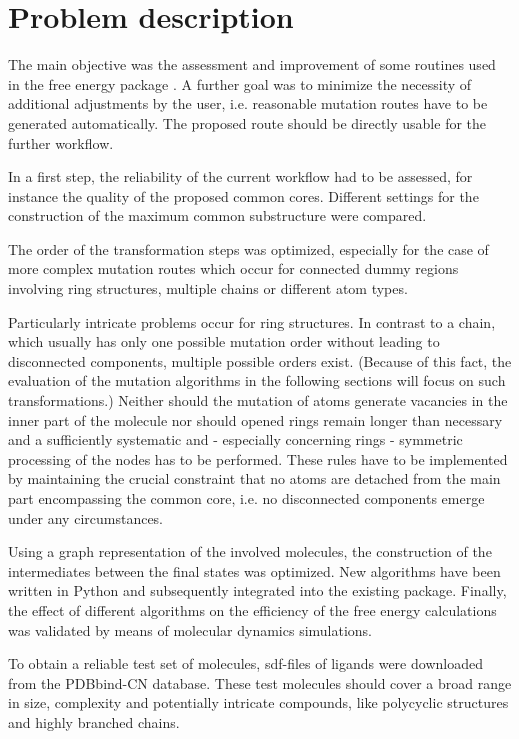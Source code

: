 \chapter{Problem description }

The main objective was the assessment and improvement of some routines
used in the free energy package {\trafo}. A further goal was to
minimize the necessity of additional adjustments by the user, i.e.
reasonable mutation routes have to be generated automatically. The
proposed route should be directly usable for the further {\trafo}
workflow.

In a first step, the reliability of the current {\trafo} workflow
had to be assessed, for instance the quality of the proposed common
cores. Different settings for the construction of the maximum common
substructure were compared. 

The order of the transformation steps was optimized, especially
for the case of more complex mutation routes which occur for connected
dummy regions involving ring structures, multiple chains or different
atom types. 

Particularly intricate problems occur for ring structures. In contrast to a chain, which usually has only one possible mutation order without leading to disconnected components, multiple possible orders exist. (Because of this fact, the evaluation of the mutation algorithms in the following sections will focus on such transformations.) Neither should
the mutation of atoms generate vacancies in the inner part of the
molecule nor should opened rings remain longer than necessary and
a sufficiently systematic and - especially concerning rings - symmetric
processing of the nodes has to be performed. These rules have to be
implemented by maintaining the crucial constraint that no atoms are
detached from the main part encompassing the common core, i.e. no
disconnected components emerge under any circumstances.

Using a graph representation of the involved molecules, the construction
of the intermediates between the final states was optimized.
New algorithms have been written in Python and subsequently integrated
into the existing {\trafo} package. Finally, the effect of different
algorithms on the efficiency of the free energy calculations was validated by means of molecular dynamics simulations. 

To obtain a reliable test set of molecules, sdf-files of ligands were downloaded from the PDBbind-CN database. These test molecules should cover a
broad range in size, complexity and potentially intricate compounds,
like polycyclic structures and highly branched chains.

